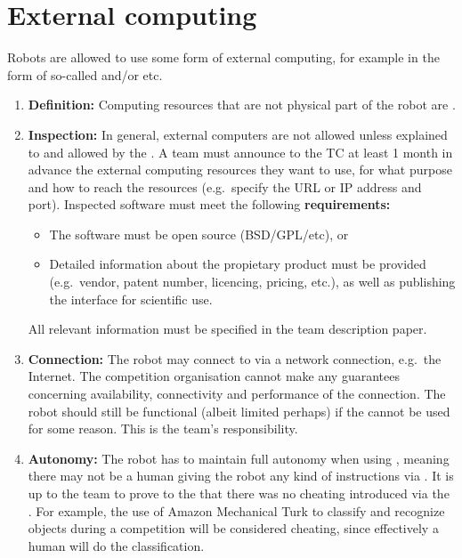 \section{External computing}\label{rule:robot_external_computing}
Robots are allowed to use some form of external computing, for example in the form of so-called  and/or  etc.
\begin{enumerate}
	\item \textbf{Definition:} Computing resources that are not physical part of the robot are .
	\item \textbf{Inspection:} In general, external computers are not allowed unless explained to and allowed by the .
	  A team must announce to the TC at least 1 month in advance the external computing resources they want to use, for what purpose and how to reach the resources (e.g.~specify the URL or IP address and port). Inspected software must meet the following \textbf{requirements:}
	  \begin{itemize}
	  	\item The software must be open source (BSD/GPL/etc), or
        \item Detailed information about the propietary product must be provided (e.g.~vendor, patent number, licencing, pricing, etc.), as well as publishing the interface for scientific use.
	  \end{itemize}
	All relevant information must be specified in the team description paper.
	\item \textbf{Connection:} The robot may connect to  via a network connection, e.g.~the Internet.
	  The competition organisation cannot make any guarantees concerning availability, connectivity and performance of the connection.
	  The robot should still be functional (albeit limited perhaps) if the  cannot be used for some reason.
	  This is the team's responsibility.
	\item \textbf{Autonomy:} The robot has to maintain full autonomy when using ,
	  meaning there may not be a human giving the robot any kind of instructions via .
	  It is up to the team to prove to the  that there was no cheating introduced via the .
	  For example, the use of Amazon Mechanical Turk to classify and recognize objects during a competition will be considered cheating, since effectively a human will do the classification.

\end{enumerate}
